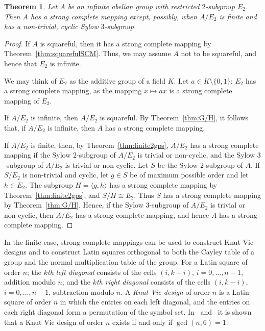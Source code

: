 \documentclass[12pt,a4paper]{article}
\newtheorem{thm}{Theorem}[section]
\begin{document}
\begin{thm}\label{thm:InftyAbSCM}
Let $A$ be an infinite abelian group with restricted $2$-subgroup $E_2$. Then $A$ has a strong complete mapping except, possibly, when $A/E_2$ is finite and has a non-trivial, cyclic Sylow $3$-subgroup.
\end{thm}
\begin{proof}
If $A$ is squareful, then it has a strong complete mapping by Theorem~\ref{thm:squarefulSCM}. Thus, we may assume $A$ not to be squareful, and hence that $E_2$ is infinite. 

We may think of $E_2$ as the additive group of a field $K$. Let $a\in K\setminus\{0,1\}$: $E_2$ has a strong complete mapping, as the mapping $x\mapsto ax$ is a strong complete mapping of $E_2$.

If $A/E_2$ is infinite, then $A/E_2$ is squareful. By Theorem~\ref{thm:G/H}, it follows that, if $A/E_2$ is infinite, then $A$ has a strong complete mapping.

If $A/E_2$ is finite, then, by Theorem~\ref{thm:finite2gps}, $A/E_2$ has a strong complete mapping if the Sylow $2$-subgroup of $A/E_2$ is trivial or non-cyclic, and the Sylow $3$-subgroup of $A/E_2$ is trivial or non-cyclic. Let $S$ be the Sylow $2$-subgroup of $A$. If $S/E_2$ is non-trivial and cyclic, let $g\in S$ be of maximum possible order and let $h\in E_2$. The subgroup $H=\langle g,h\rangle$ has a strong complete mapping by Theorem~\ref{thm:finite2gps}, and $S/H\cong E_2$. Thus $S$ has a strong complete mapping by Theorem~\ref{thm:G/H}. Hence, if the Sylow $3$-subgroup of $A/E_2$ is trivial or non-cyclic, then $A/E_2$ has a strong complete mapping, and hence $A$ has a strong complete mapping.
\end{proof}



In the finite case, strong complete mappings can be used to construct Knut Vic designs and to construct Latin squares orthogonal to both the Cayley table of a group and the normal multiplication table of the group. For a Latin square of order $n$; the {\em $k$th left diagonal} consists of the cells $(i,k+i)$, $i=0,\dots,n-1$, addition modulo $n$; and the {\em $k$th right diagonal} consists of the cells $(i,k-i)$, $i=0,\dots,n-1$, subtraction modulo $n$. A {\em Knut Vic design} of order $n$ is a Latin square of order $n$ in which the entries on each left diagonal, and the entries on each right diagonal form a permutation of the symbol set. In~\cite{Hedayat:1977} and~\cite{Hedayat/Federer:1975} it is shown that a Knut Vic design of order $n$ exists if and only if $\gcd(n,6)=1$. 
\end{document}
